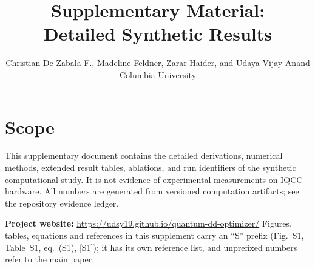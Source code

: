 \documentclass[conference]{IEEEtran}
\title{Supplementary Material:\\Detailed Synthetic Results}
\author{Christian De Zabala F., Madeline Feldner, Zarar Haider, and Udaya Vijay Anand\\
Columbia University}
\begin{document}
\maketitle
\section*{Scope}
This supplementary document contains the detailed derivations, numerical methods,
extended result tables, ablations, and run identifiers of the synthetic computational study. It is not evidence of
experimental measurements on IQCC hardware. All numbers are generated from
versioned computation artifacts; see the repository evidence ledger.
\par\noindent\textbf{Project website:} \url{https://udsy19.github.io/quantum-dd-optimizer/}
Figures, tables, equations and references in this supplement carry an ``S'' prefix
(Fig.~S1, Table~S1, eq.~(S1), [S1]); it has its own reference list, and unprefixed
numbers refer to the main paper.
\appendices






\end{document}
